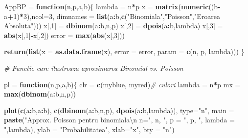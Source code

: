 \documentclass[]{article}
\newenvironment{Shaded}{\begin{snugshade}}{\end{snugshade}}
\newcommand{\CharTok}[1]{\textcolor[rgb]{0.31,0.60,0.02}{#1}}
\newcommand{\CommentTok}[1]{\textcolor[rgb]{0.56,0.35,0.01}{\textit{#1}}}
\newcommand{\ControlFlowTok}[1]{\textcolor[rgb]{0.13,0.29,0.53}{\textbf{#1}}}
\newcommand{\DataTypeTok}[1]{\textcolor[rgb]{0.13,0.29,0.53}{#1}}
\newcommand{\DecValTok}[1]{\textcolor[rgb]{0.00,0.00,0.81}{#1}}
\newcommand{\KeywordTok}[1]{\textcolor[rgb]{0.13,0.29,0.53}{\textbf{#1}}}
\newcommand{\NormalTok}[1]{#1}
\newcommand{\OperatorTok}[1]{\textcolor[rgb]{0.81,0.36,0.00}{\textbf{#1}}}
\newcommand{\StringTok}[1]{\textcolor[rgb]{0.31,0.60,0.02}{#1}}
\begin{document}
\begin{Shaded}
\begin{Highlighting}[]
\NormalTok{AppBP =}\StringTok{ }\ControlFlowTok{function}\NormalTok{(n,p,a,b)\{}
\NormalTok{    lambda =}\StringTok{ }\NormalTok{n}\OperatorTok{*}\NormalTok{p}
\NormalTok{    x =}\StringTok{ }\KeywordTok{matrix}\NormalTok{(}\KeywordTok{numeric}\NormalTok{((b}\OperatorTok{-}\NormalTok{a}\OperatorTok{+}\DecValTok{1}\NormalTok{)}\OperatorTok{*}\DecValTok{3}\NormalTok{),}\DataTypeTok{ncol=}\DecValTok{3}\NormalTok{,}
               \DataTypeTok{dimnames =} \KeywordTok{list}\NormalTok{(a}\OperatorTok{:}\NormalTok{b,}\KeywordTok{c}\NormalTok{(}\StringTok{"Binomiala"}\NormalTok{,}\StringTok{"Poisson"}\NormalTok{,}\StringTok{"Eroarea Absoluta"}\NormalTok{)))}
\NormalTok{    x[,}\DecValTok{1}\NormalTok{] =}\StringTok{ }\KeywordTok{dbinom}\NormalTok{(a}\OperatorTok{:}\NormalTok{b,n,p)}
\NormalTok{    x[,}\DecValTok{2}\NormalTok{] =}\StringTok{ }\KeywordTok{dpois}\NormalTok{(a}\OperatorTok{:}\NormalTok{b,lambda)}
\NormalTok{    x[,}\DecValTok{3}\NormalTok{] =}\StringTok{ }\KeywordTok{abs}\NormalTok{(x[,}\DecValTok{1}\NormalTok{]}\OperatorTok{-}\NormalTok{x[,}\DecValTok{2}\NormalTok{])}
\NormalTok{    error =}\StringTok{ }\KeywordTok{max}\NormalTok{(}\KeywordTok{abs}\NormalTok{(x[,}\DecValTok{3}\NormalTok{]))}
    
    \KeywordTok{return}\NormalTok{(}\KeywordTok{list}\NormalTok{(}\DataTypeTok{x =} \KeywordTok{as.data.frame}\NormalTok{(x), }\DataTypeTok{error =}\NormalTok{ error, }\DataTypeTok{param =} \KeywordTok{c}\NormalTok{(n, p, lambda)))}
\NormalTok{\}}

\CommentTok{# Functie care ilustreaza aproximarea Binomial vs. Poisson}

\NormalTok{pl =}\StringTok{ }\ControlFlowTok{function}\NormalTok{(n,p,a,b)\{}
\NormalTok{    clr =}\StringTok{ }\KeywordTok{c}\NormalTok{(myblue, myred)}\CommentTok{# culori}
\NormalTok{    lambda =}\StringTok{ }\NormalTok{n}\OperatorTok{*}\NormalTok{p}
\NormalTok{    mx =}\StringTok{ }\KeywordTok{max}\NormalTok{(}\KeywordTok{dbinom}\NormalTok{(a}\OperatorTok{:}\NormalTok{b,n,p))}
    
    \KeywordTok{plot}\NormalTok{(}\KeywordTok{c}\NormalTok{(a}\OperatorTok{:}\NormalTok{b,a}\OperatorTok{:}\NormalTok{b), }\KeywordTok{c}\NormalTok{(}\KeywordTok{dbinom}\NormalTok{(a}\OperatorTok{:}\NormalTok{b,n,p), }\KeywordTok{dpois}\NormalTok{(a}\OperatorTok{:}\NormalTok{b,lambda)), }\DataTypeTok{type=}\StringTok{"n"}\NormalTok{, }
         \DataTypeTok{main =} \KeywordTok{paste}\NormalTok{(}\StringTok{"Approx. Poisson pentru binomiala}\CharTok{\textbackslash{}n}\StringTok{ n="}\NormalTok{, }
\NormalTok{                      n, }\StringTok{", p = "}\NormalTok{, p, }\StringTok{", lambda = "}\NormalTok{,lambda), }
         \DataTypeTok{ylab =} \StringTok{"Probabilitatea"}\NormalTok{, }\DataTypeTok{xlab=}\StringTok{"x"}\NormalTok{,}
         \DataTypeTok{bty =} \StringTok{"n"}\NormalTok{)}
    

\end{Highlighting}
\end{Shaded}
\end{document}
